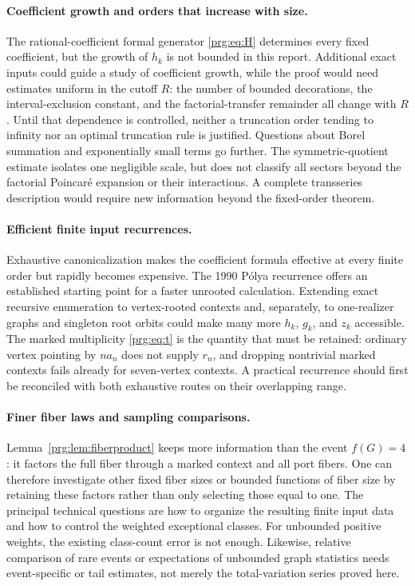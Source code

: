\documentclass[11pt,letterpaper]{article}
\numberwithin{equation}{section}
\theoremstyle{definition}\newtheorem{definition}[theorem]{Definition}
\theoremstyle{remark}\newtheorem{remark}[theorem]{Remark}
\begin{document}
\paragraph{Coefficient growth and orders that increase with size.}
The rational-coefficient formal generator \eqref{prg:eq:H} determines every fixed
coefficient, but the growth of $h_k$ is not bounded in this report.
Additional exact inputs could guide a study of coefficient growth,
while the proof would need estimates uniform in the cutoff $R$:
the number of bounded decorations, the interval-exclusion constant,
and the factorial-transfer remainder all change with $R$. Until
that dependence is controlled, neither a truncation order tending
to infinity nor an optimal truncation rule is justified. Questions
about Borel summation and exponentially small terms go further.
The symmetric-quotient estimate isolates one negligible scale, but
does not classify all sectors beyond the factorial Poincar\'e
expansion or their interactions. A complete transseries description
would require new information beyond the fixed-order theorem.

\paragraph{Efficient finite input recurrences.}
Exhaustive canonicalization makes the coefficient formula effective
at every finite order but rapidly becomes expensive. The 1990
P\'olya recurrence offers an established starting point for a faster
unrooted calculation. Extending exact recursive enumeration to
vertex-rooted contexts and, separately, to one-realizer graphs and
singleton root orbits could make many more $h_k$, $g_k$, and $z_k$
accessible. The marked multiplicity \eqref{prg:eq:t} is the quantity
that must be retained: ordinary vertex pointing by $na_n$ does
not supply $r_n$, and dropping nontrivial marked contexts fails
already for seven-vertex contexts. A practical recurrence should first be
reconciled with both exhaustive routes on their overlapping range.

\paragraph{Finer fiber laws and sampling comparisons.}
Lemma~\ref{prg:lem:fiberproduct} keeps more information than the event
$f(G)=4$: it factors the full fiber through a marked context and
all port fibers. One can therefore investigate other fixed fiber
sizes or bounded functions of fiber size by retaining these factors
rather than only selecting those equal to one. The principal
technical questions are how to organize the resulting finite input
data and how to control the weighted exceptional classes. For
unbounded positive weights, the existing class-count error is not
enough. Likewise, relative comparison of rare events or expectations
of unbounded graph statistics needs event-specific or tail estimates,
not merely the total-variation series proved here.
\end{document}

